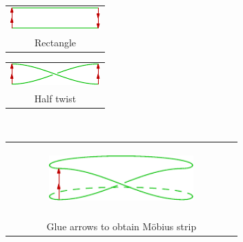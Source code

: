 \begin{center}
	\begin{tabular}{c}
		\includegraphics[scale=3.4]{relations-10-mobius}\\
		Rectangle
	\end{tabular}
	\hspace*{.5cm}
	\begin{tabular}{c}
		\includegraphics[scale=3.4]{relations-11-mobius}\\
		Half twist
	\end{tabular}\\[15pt]
	\begin{tabular}{c}
		\includegraphics[width=0.65\textwidth,height=75pt]{relations-12-mobius}\\
		Glue arrows to obtain Möbius strip\\[15pt]
	\end{tabular}
\end{center}


